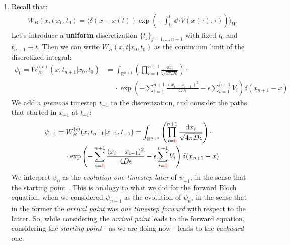 \documentclass[../template.tex]{subfiles}
\begin{document}
\begin{exo}
\begin{enumerate}
        \item Recall that:
        \begin{align*}
            W_B(x,t|x_0,t_0) = \langle \delta(x-x(t)) \exp\left(-\int_{t_0}^t \dd{\tau} V(x(\tau), \tau)\right) \rangle_W
        \end{align*}
        Let's introduce a \textbf{uniform}  discretization $\{t_j\}_{j=1,\dots,n+1}$ with fixed $t_0$ and $t_{n+1} \equiv t$. Then we can write $W_B(x,t|x_0,t_0)$ as the continuum limit of the discretized integral:
        \begin{align*}
            \psi_{0} = W_{B}^{(\epsilon)}(x,t_{n+1}|x_0,t_0) &= \int_{\mathbb{R}^{n+1}} \left(\prod_{i=1}^{n+1} \frac{\dd{x_i}}{\sqrt{4 \pi D \epsilon}} \right) \cdot\\
            &\quad \>\cdot  \exp\left(-\sum_{i=1}^{n+1} \frac{(x_i - x_{i-1})^2}{4D \epsilon}  - \epsilon \sum_{i=1}^{n+1} V_i\right) \delta(x_{n+1}-x)
        \end{align*}
        We add a \textit{previous} timestep $t_{-1}$ to the discretization, and consider the paths that started in $x_{-1}$ at $t_{-1}$:
        \begin{align*}
            \psi_{-1} &= W_B^{(\epsilon)}(x,t_{n+1}|x_{-1},t_{-1}) =  \int_{\mathbb{R}^{n+2}} \left(\prod_{i=\textcolor{Red}{0}}^{n+1} \frac{\dd{x_i}}{\sqrt{4 \pi D \epsilon}} \right) \cdot\\
            &\quad \>\cdot  \exp\left(-\sum_{i=\textcolor{Red}{0}}^{n+1} \frac{(x_i - x_{i-1})^2}{4D \epsilon}  - \epsilon \sum_{i=\textcolor{Red}{0}}^{n+1} V_i\right) \delta(x_{n+1}-x)
        \end{align*}
        We interpret $\psi_0$ as the \textit{evolution one timestep later} of $\psi_{-1}$, in the sense that the starting point . This is analogy to what we did for the forward Bloch equation, when we considered $\psi_{n+1}$ as the evolution of $\psi_n$, in the sense that in the former the \textit{arrival point} was \textit{one timestep forward} with respect to the latter. So, while considering the \textit{arrival point} leads to the forward equation, considering the \textit{starting point} - as we are doing now - leads to the \textit{backward} one.
        
        \medskip


\end{enumerate}
\end{exo}
\end{document}
